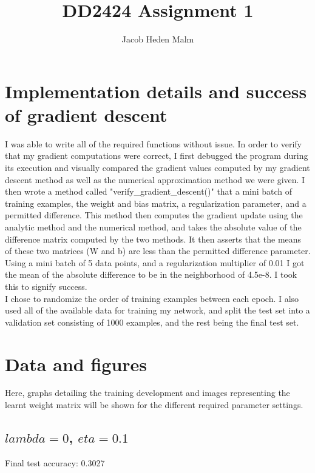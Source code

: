 \documentclass[11pt,a4paper]{article}
\author{Jacob Heden Malm}
\title{DD2424 Assignment 1}
\begin{document}
\maketitle

\section{Implementation details and success of gradient descent}

I was able to write all of the required functions without issue. In order to verify that my gradient computations were correct, I first debugged the program during its execution and visually compared the gradient values computed by my gradient descent method as well as the numerical approximation method we were given. I then wrote a method called "verify\_gradient\_descent()" that a mini batch of training examples, the weight and bias matrix, a regularization parameter, and a permitted difference. This method then computes the gradient update using the analytic method and the numerical method, and takes the absolute value of the difference matrix computed by the two methods. It then asserts that the means of these two matrices (W and b) are less than the permitted difference parameter. Using a mini batch of 5 data points, and a regularization multiplier of 0.01 I got the mean of the absolute difference to be in the neighborhood of 4.5e-8. I took this to signify success.\\

I chose to randomize the order of training examples between each epoch. I also used all of the available data for training my network, and split the test set into a validation set consisting of 1000 examples, and the rest being the final test set.

\section{Data and figures}
Here, graphs detailing the training development and images representing the learnt weight matrix will be shown for the different required parameter settings.

\subsection{$lambda=0$, $eta=0.1$}
Final test accuracy: 0.3027
\end{document}
